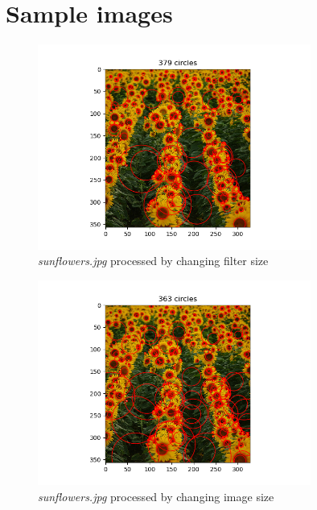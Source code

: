 \documentclass{article}
\begin{document}
\newpage
\section{Sample images}
\begin{figure}[H]
\centering
\includegraphics[width=0.8\textwidth]{figs/sunflowers_filter.png}
\caption{\textit{sunflowers.jpg} processed by changing filter size}
\end{figure}


\begin{figure}[H]
\centering
\includegraphics[width=0.8\textwidth]{figs/sunflowers_image.png}
\caption{\textit{sunflowers.jpg} processed by changing image size}
\end{figure}
\end{document}
